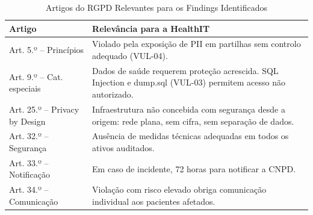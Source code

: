 \documentclass[12pt, a4paper]{report}
\newcommand{\thead}[1]{\bfseries\small\color{white}#1}
\begin{document}
\begin{table}[H]
\centering
\caption{Artigos do RGPD Relevantes para os Findings Identificados}
\begin{tabularx}{\linewidth}{l X}
\toprule
\rowcolor{TableHead}
\thead{Artigo} & \thead{Relevância para a HealthIT} \\
\midrule
Art. 5.º -- Princípios & Violado pela exposição de PII em partilhas sem controlo adequado (VUL-04). \\
\rowcolor{TableAlt}
Art. 9.º -- Cat. especiais & Dados de saúde requerem proteção acrescida. SQL Injection e dump.sql (VUL-03) permitem acesso não autorizado. \\
Art. 25.º -- Privacy by Design & Infraestrutura não concebida com segurança desde a origem: rede plana, sem cifra, sem separação de dados. \\
\rowcolor{TableAlt}
Art. 32.º -- Segurança & Ausência de medidas técnicas adequadas em todos os ativos auditados. \\
Art. 33.º -- Notificação & Em caso de incidente, 72 horas para notificar a CNPD. \\
\rowcolor{TableAlt}
Art. 34.º -- Comunicação & Violação com risco elevado obriga comunicação individual aos pacientes afetados. \\
\bottomrule
\end{tabularx}
\end{table}
\end{document}
